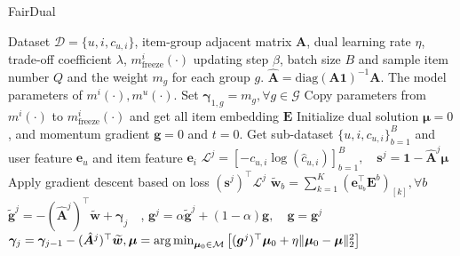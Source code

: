 
\begin{algorithm}[t]
    \caption{FairDual}
	\label{alg:fairdual}
	\begin{algorithmic}[1]
	\REQUIRE Dataset $\mathcal{D} = \{u,i,c_{u,i}\}$, item-group adjacent matrix $\bm{A}$, dual learning rate $\eta$, trade-off coefficient $\lambda$, $m^i_{\text{freeze}}(\cdot)$ updating step $\beta$, batch size $B$ and sample item number $Q$ and the weight $m_g$ for each group $g$. $\hat{\bm{A}}=\text{diag}(\bm{A}\bm{1})^{-1}\bm{A}$.
	\ENSURE The model parameters of $m^i(\cdot), m^u(\cdot)$.
	       \STATE Set $\bm{\gamma}_{1,g}=m_g, \forall g\in\mathcal{G}$
                 \STATE Copy parameters from $m^i(\cdot)$ to $m^i_{\text{freeze}}(\cdot)$ and get all item embedding $\bm{E}$
                 \STATE Initialize dual solution $\bm{\mu} = 0$, and momentum gradient $\bm{g} = 0$ and $t=0$.
                 \ENDIF
    	    \STATE Get sub-dataset $\{u,i,c_{u,i}\}_{b=1}^B$ and user feature $\bm{e}_u$ and item feature $\bm{e}_i$
    	    \STATE $\mathcal{L}^j = [-c_{u, i}\log(\hat{c}_{u,i})]_{b=1}^B, \quad \bm{s}^j = \bm{1} - \hat{\bm{A}}^j\bm{\mu}$
                \STATE Apply gradient descent based on loss $(\bm{s}^j)^{\top}\mathcal{L}^j$
                \STATE $\widetilde{\bm{w}}_b = \sum_{k=1}^K (\bm{e}_{u_b}^{\top}\bm{E}^b)_{[k]}, \forall b$
    	    \STATE $\widetilde{\bm{g}}^j = -(\hat{\bm{A}}^j)^{\top} \widetilde{\bm{w}}+ \bm{\gamma}_j\quad$, $\bm{g}^j=\alpha \widetilde{\bm{g}}^j + (1-\alpha)\mathbf{g}, \quad \bm{g}=\bm{g}^j$
                \STATE $\bm{\gamma}_j=\bm{\gamma}_{j-1}-(\hat{\bm{A}}^j)^{\top} \widetilde{\bm{w}},  \bm{\mu} =  \operatorname*{arg\,min}_{\bm{\mu}_0\in\mathcal{M}} \left[(\bm{g}^j)^{\top}\bm{\mu}_0 + \eta \|\bm{\mu}_0-\bm{\mu}\|_2^2\right]$
	       \ENDFOR
        \ENDFOR
	
	\end{algorithmic}
 
\end{algorithm}

